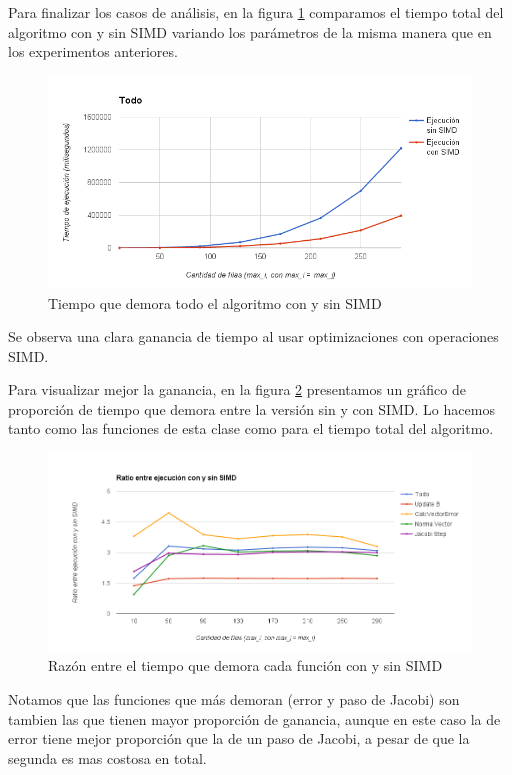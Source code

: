 \documentclass[a4paper]{article}
\begin{document}
Para finalizar los casos de análisis, en la figura \ref{fig:All} comparamos el tiempo total del algoritmo con y sin SIMD variando los parámetros de la misma manera que en los experimentos anteriores.

\begin{figure}[!htbp]
  \centering
	\includegraphics[width=.8\linewidth]{images/All.png}
  \caption{Tiempo que demora todo el algoritmo con y sin SIMD}
  \label{fig:All}
\end{figure}
Se observa una clara ganancia de tiempo al usar optimizaciones con operaciones SIMD.\\
\bigskip

Para visualizar mejor la ganancia, en la figura \ref{fig:RatioSIMD2} 
presentamos un gráfico de proporción de tiempo que demora entre 
la versión sin y con SIMD. Lo hacemos tanto como las funciones de 
esta clase como para el tiempo total del algoritmo.

\begin{figure}[!htbp]
  \centering
	\includegraphics[scale = 0.55]{images/RatioSIMD2.png}
  \caption{Razón entre el tiempo que demora cada función con y sin SIMD}
	\label{fig:RatioSIMD2}
\end{figure}

Notamos que las funciones que más demoran (error y paso de Jacobi) 
son tambien las que tienen mayor proporción de ganancia, aunque en 
este caso la de error tiene mejor proporción que la de un paso de 
Jacobi, a pesar de que la segunda es mas costosa en total.\\
\end{document}
